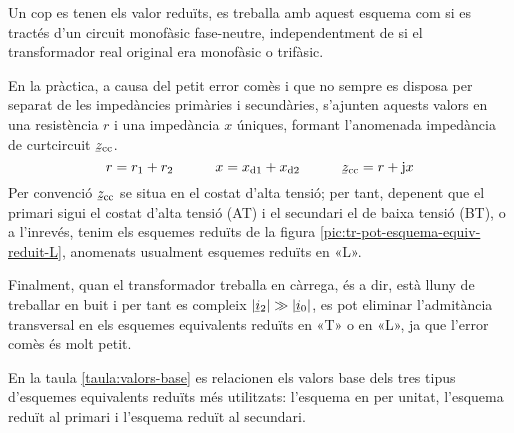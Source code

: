 Un cop es tenen els valor reduïts, es treballa amb aquest esquema com si es tractés d'un circuit monofàsic fase-neutre, independentment de si el transformador real original era monofàsic o trifàsic.

En la pràctica, a causa del petit error comès i que no sempre es disposa per separat de les impedàncies primàries i secundàries,  s'ajunten aquests valors en una resistència $r$ i una  impedància $x$ úniques, formant l'anomenada impedància de curtcircuit $\cmplx{z}\ped{cc}$.
\begin{equation}
    r= r\ped{1}+r\ped{2} \qquad\quad x= x\ped{d1}+x\ped{d2} \qquad\quad \cmplx{z}\ped{cc} = r + \ju x
\end{equation}
Per convenció $\cmplx{z}\ped{cc}$ se situa en el costat d'alta tensió; per tant, depenent que el primari  sigui el costat d'alta tensió (AT) i el secundari el de baixa tensió (BT), o a l'inrevés, tenim els esquemes reduïts de la figura \vref{pic:tr-pot-esquema-equiv-reduit-L}, anomenats usualment esquemes reduïts en «L».  
\begin{center}
    
    \label{pic:tr-pot-esquema-equiv-reduit-L}
\end{center}

\vspace{-4mm}
Finalment, quan el transformador treballa en càrrega, és a dir, està lluny de treballar en buit i per tant es compleix $|\cmplx{i}_2| \gg |\cmplx{i}_0|$, es pot eliminar l'admitància transversal en els esquemes equivalents reduïts en «T» o en «L», ja que l'error comès és molt petit.

En la  taula \vref{taula:valors-base} es relacionen els valors base dels tres tipus d'esquemes equivalents reduïts més utilitzats: l'esquema en per unitat, l'esquema reduït al primari i l'esquema reduït al secundari.

